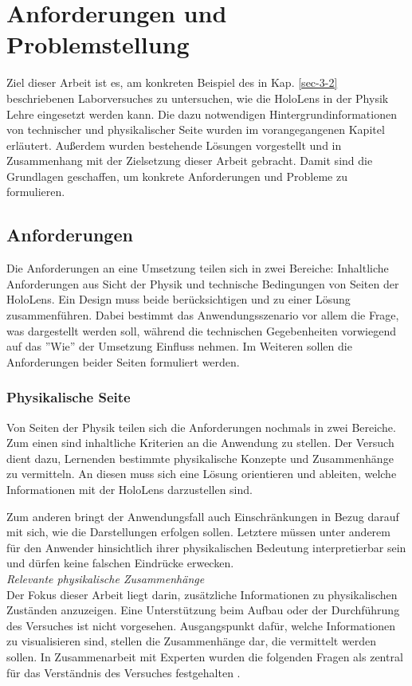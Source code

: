 \section{Anforderungen und Problemstellung}
\label{sec-3}
Ziel dieser Arbeit ist es, am konkreten Beispiel des in Kap. \ref{sec-3-2} beschriebenen Laborversuches zu untersuchen, wie die HoloLens in der Physik Lehre eingesetzt werden kann. Die dazu notwendigen Hintergrundinformationen von technischer und physikalischer Seite wurden im vorangegangenen Kapitel erläutert. Außerdem wurden bestehende Lösungen vorgestellt und in Zusammenhang mit der Zielsetzung dieser Arbeit gebracht. Damit sind die Grundlagen geschaffen, um konkrete Anforderungen und Probleme zu formulieren.

\subsection{Anforderungen}
\label{sec-3-1}
Die Anforderungen an eine Umsetzung teilen sich in zwei Bereiche: Inhaltliche Anforderungen aus Sicht der Physik und technische Bedingungen von Seiten der HoloLens. Ein Design muss beide berücksichtigen und zu einer Lösung zusammenführen. Dabei bestimmt das Anwendungsszenario vor allem die Frage, was dargestellt werden soll, während die technischen Gegebenheiten vorwiegend auf das ''Wie'' der Umsetzung Einfluss nehmen. Im Weiteren sollen die Anforderungen beider Seiten formuliert werden.

\subsubsection{Physikalische Seite}
\label{sec-3-1-1}
Von Seiten der Physik teilen sich die Anforderungen nochmals in zwei Bereiche. Zum einen sind inhaltliche Kriterien an die Anwendung zu stellen. Der Versuch dient dazu, Lernenden bestimmte physikalische Konzepte und Zusammenhänge zu vermitteln. An diesen muss sich eine Lösung orientieren und ableiten, welche Informationen mit der HoloLens darzustellen sind.
\par
\noindent\hspace*{5mm}
Zum anderen bringt der Anwendungsfall auch Einschränkungen in Bezug darauf mit sich, wie die Darstellungen erfolgen sollen. Letztere müssen unter anderem für den Anwender hinsichtlich ihrer physikalischen Bedeutung interpretierbar sein und dürfen keine falschen Eindrücke erwecken.\\

\textit{Relevante physikalische Zusammenhänge}\\
Der Fokus dieser Arbeit liegt darin, zusätzliche Informationen zu physikalischen Zuständen anzuzeigen. Eine Unterstützung beim Aufbau oder der Durchführung des Versuches ist nicht vorgesehen. Ausgangspunkt dafür, welche Informationen zu visualisieren sind, stellen die Zusammenhänge dar, die vermittelt werden sollen. In Zusammenarbeit mit Experten wurden die folgenden Fragen als zentral für das Verständnis des Versuches festgehalten \autocite{Reinholz18}.


